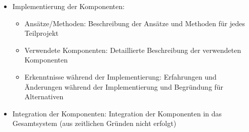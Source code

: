 \begin{itemize}

	\item Implementierung der Komponenten:
	\begin{itemize}
		\item Ansätze/Methoden: Beschreibung der Ansätze und Methoden für jedes Teilprojekt
		\item Verwendete Komponenten: Detaillierte Beschreibung der verwendeten Komponenten
		\item Erkenntnisse während der Implementierung: Erfahrungen und Änderungen während der Implementierung und Begründung für Alternativen
	\end{itemize}
	\item Integration der Komponenten: Integration der Komponenten in das Gesamtsystem (aus zeitlichen Gründen nicht erfolgt)
\end{itemize}


